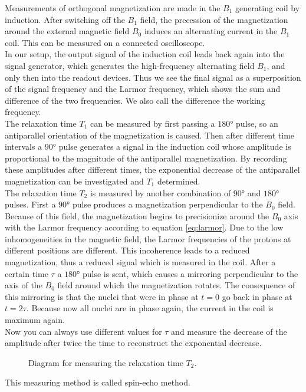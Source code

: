 Measurements of orthogonal magnetization are made in the $B_1$ generating coil by induction.
After switching off the $B_1$ field, the precession of the magnetization around the external magnetic field $B_0$ induces an alternating current in the $B_1$ coil.
This can be measured on a connected oscilloscope.\\
In our setup, the output signal of the induction coil leads back again into the signal generator, which generates the high-frequency alternating field $B_1$, and only then into the readout devices.
Thus we see the final signal as a superposition of the signal frequency and the Larmor frequency, which shows the sum and difference of the two frequencies.
We also call the difference the working frequency.\\

The relaxation time $T_1$ can be measured by first passing a $\ang{180}$ pulse, so an antiparallel orientation of the magnetization is caused.
Then after different time intervals a $\ang{90}$ pulse generates a signal in the induction coil whose amplitude is proportional to the magnitude of the antiparallel magnetization.
By recording these amplitudes after different times, the exponential decrease of the antiparallel magnetization can be investigated and $T_1$ determined.\\

The relaxation time $T_2$ is measured by another combination of $\ang{90}$ and $\ang{180}$ pulses.
First a $\ang{90}$ pulse produces a magnetization perpendicular to the $B_0$ field.
Because of this field, the magnetization begins to precisionize around the $B_0$ axis with the Larmor frequency according to equation \ref{eq:larmor}.
Due to the low inhomogeneities in the magnetic field, the Larmor frequencies of the protons at different positions are different.
This incoherence leads to a reduced magnetization, thus a reduced signal which is measured in the coil.
After a certain time $\tau$ a $\ang{180}$ pulse is sent, which causes a mirroring perpendicular to the axis of the $B_0$ field around which the magnetization rotates.
The consequence of this mirroring is that the nuclei that were in phase at $t=0$ go back in phase at $t=2\tau$.
Because now all nuclei are in phase again, the current in the coil is maximum again.\\
Now you can always use different values for $\tau$ and measure the decrease of the amplitude after twice the time to reconstruct the exponential decrease.
\begin{figure}[ht]
\centering

\caption{Diagram for measuring the relaxation time $T_2$.}
\label{fig:relaxation}
\end{figure}
This measuring method is called spin-echo method.\\

